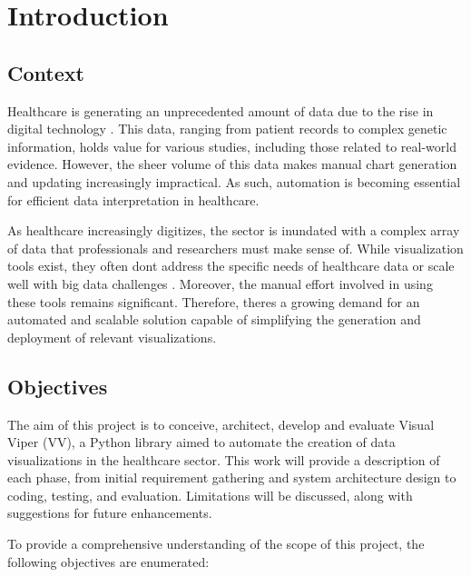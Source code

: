 \chapter{Introduction}\label{introduction}

\minitoc

\section{Context}

Healthcare is generating an unprecedented amount of data due to the rise in digital technology \cite{1,2}. This data, ranging from patient records to complex genetic information, holds value for various studies, including those related to real-world evidence.
However, the sheer volume of this data makes manual chart generation and updating increasingly impractical. As such, automation is becoming
essential for efficient data interpretation in healthcare.

As healthcare increasingly digitizes, the sector is inundated with a
complex array of data that professionals and researchers must make sense of. While visualization tools exist, they often don\textquotesingle t address the specific needs of healthcare data or scale well with big
data challenges
\cite{3,4}. Moreover, the manual effort involved in using these tools remains significant.
Therefore, there\textquotesingle s a growing demand for an automated and scalable solution capable of simplifying the generation and deployment of relevant visualizations.

\section{Objectives}\label{objectives}

The aim of this project is to conceive, architect, develop and evaluate
Visual Viper (VV), a Python library aimed to automate the creation of
data visualizations in the healthcare sector. This work will provide a
description of each phase, from initial requirement gathering and system
architecture design to coding, testing, and evaluation. Limitations will
be discussed, along with suggestions for future enhancements.

To provide a comprehensive understanding of the scope of this project,
the following objectives are enumerated:

